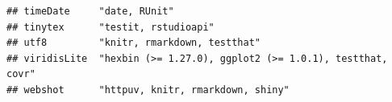 \documentclass[]{article}
\begin{document}
\begin{verbatim}
## timeDate     "date, RUnit"                                                                                                                                                                                                                                                                                                                                                                                                                                                                                                                                                                             
## tinytex      "testit, rstudioapi"                                                                                                                                                                                                                                                                                                                                                                                                                                                                                                                                                                      
## utf8         "knitr, rmarkdown, testthat"                                                                                                                                                                                                                                                                                                                                                                                                                                                                                                                                                              
## viridisLite  "hexbin (>= 1.27.0), ggplot2 (>= 1.0.1), testthat, covr"                                                                                                                                                                                                                                                                                                                                                                                                                                                                                                                                  
## webshot      "httpuv, knitr, rmarkdown, shiny"                                                                                                                                                                                                                                                                                                                                                                                                                                                                                                                                                         

\end{verbatim}
\end{document}
